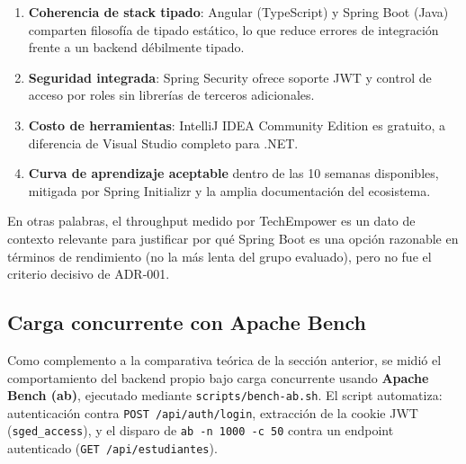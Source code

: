 \documentclass[12pt,a4paper]{article}
\begin{document}
\begin{enumerate}
  \item \textbf{Coherencia de stack tipado}: Angular (TypeScript) y Spring
    Boot (Java) comparten filosofía de tipado estático, lo que reduce
    errores de integración frente a un backend débilmente tipado.
  \item \textbf{Seguridad integrada}: Spring Security ofrece soporte JWT y
    control de acceso por roles sin librerías de terceros adicionales.
  \item \textbf{Costo de herramientas}: IntelliJ IDEA Community Edition es
    gratuito, a diferencia de Visual Studio completo para .NET.
  \item \textbf{Curva de aprendizaje aceptable} dentro de las 10 semanas
    disponibles, mitigada por Spring Initializr y la amplia documentación
    del ecosistema.
\end{enumerate}

En otras palabras, el throughput medido por TechEmpower es un dato de
contexto relevante para justificar por qué Spring Boot es una opción
razonable en términos de rendimiento (no la más lenta del grupo evaluado),
pero no fue el criterio decisivo de ADR-001.


\subsection{Carga concurrente con Apache Bench}
\label{sec:apache-bench}

Como complemento a la comparativa teórica de la sección anterior, se midió
el comportamiento del backend propio bajo carga concurrente usando
\textbf{Apache Bench (ab)}, ejecutado mediante
\texttt{scripts/bench-ab.sh}. El script automatiza: autenticación contra
\texttt{POST /api/auth/login}, extracción de la cookie JWT
(\texttt{sged\_access}), y el disparo de \texttt{ab -n 1000 -c 50} contra
un endpoint autenticado (\texttt{GET /api/estudiantes}).
\end{document}
